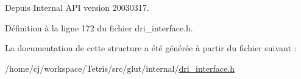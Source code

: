 \begin{DoxySince}{Depuis}
Internal A\-P\-I version 20030317. 
\end{DoxySince}


Définition à la ligne 172 du fichier dri\-\_\-interface.\-h.



La documentation de cette structure a été générée à partir du fichier suivant \-:\begin{DoxyCompactItemize}
\item 
/home/cj/workspace/\-Tetris/src/glut/internal/\hyperlink{dri__interface_8h}{dri\-\_\-interface.\-h}\end{DoxyCompactItemize}
